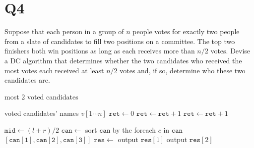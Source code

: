 \documentclass[11pt]{article}
\begin{document}
\section*{Q4}
Suppose that each person in a group of $n$ people votes for
exactly two people from a slate of candidates to ﬁll two
positions on a committee. The top two ﬁnishers both win
positions as long as each receives more than $n/2$ votes. Devise
a DC algorithm that determines whether the two candidates
who received the most votes each received at least $n/2$ votes
and, if so, determine who these two candidates are.
\begin{solution}
    \begin{algorithm}
        \caption{most 2 voted candidates}
        \begin{algorithmic}
            \Require voted candidates' names $v[1\cdots n]$
            \State $\mathtt{ret}\gets 0$
            \State $\mathtt{ret}\gets \mathtt{ret}+1$
            \EndIf
            \State $\mathtt{ret}\gets \mathtt{ret}+1$
            \EndIf
            \EndFor
            \State{}
            \EndProcedure

            \State {}
            \EndIf
            \State $\mathtt{mid}\gets (l+r) / 2$
            \State $\mathtt{can}\gets$
            \State sort $\mathtt{can}$ by the  foreach $c$ in $\mathtt{can}$
            \State \Return $[\mathtt{can[1]},\mathtt{can[2]},\mathtt{can[3]}]$
            \EndProcedure
            \State $\mathtt{res}\gets$ 
            \State output $\mathtt{res}[1]$
            \EndIf
            \State output $\mathtt{res}[2]$
            \EndIf
        \end{algorithmic}
    \end{algorithm}
\end{solution}
\end{document}
